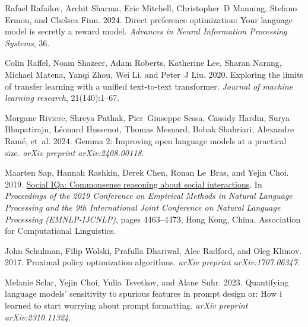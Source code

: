 \documentclass[11pt]{article}
\begin{document}
\begin{thebibliography}{88}
    Rafael Rafailov, Archit Sharma, Eric Mitchell, Christopher~D Manning, Stefano Ermon, and Chelsea Finn. 2024.
    \newblock Direct preference optimization: Your language model is secretly a reward model.
    \newblock \emph{Advances in Neural Information Processing Systems}, 36.
    
    Colin Raffel, Noam Shazeer, Adam Roberts, Katherine Lee, Sharan Narang, Michael Matena, Yanqi Zhou, Wei Li, and Peter~J Liu. 2020.
    \newblock Exploring the limits of transfer learning with a unified text-to-text transformer.
    \newblock \emph{Journal of machine learning research}, 21(140):1--67.
    
    Morgane Riviere, Shreya Pathak, Pier~Giuseppe Sessa, Cassidy Hardin, Surya Bhupatiraju, L{\'e}onard Hussenot, Thomas Mesnard, Bobak Shahriari, Alexandre Ram{\'e}, et~al. 2024.
    \newblock Gemma 2: Improving open language models at a practical size.
    \newblock \emph{arXiv preprint arXiv:2408.00118}.
    
    Maarten Sap, Hannah Rashkin, Derek Chen, Ronan Le~Bras, and Yejin Choi. 2019.
    \newblock \href {https://doi.org/10.18653/v1/D19-1454} {Social {IQ}a: Commonsense reasoning about social interactions}.
    \newblock In \emph{Proceedings of the 2019 Conference on Empirical Methods in Natural Language Processing and the 9th International Joint Conference on Natural Language Processing (EMNLP-IJCNLP)}, pages 4463--4473, Hong Kong, China. Association for Computational Linguistics.
    
    John Schulman, Filip Wolski, Prafulla Dhariwal, Alec Radford, and Oleg Klimov. 2017.
    \newblock Proximal policy optimization algorithms.
    \newblock \emph{arXiv preprint arXiv:1707.06347}.
    
    Melanie Sclar, Yejin Choi, Yulia Tsvetkov, and Alane Suhr. 2023.
    \newblock Quantifying language models' sensitivity to spurious features in prompt design or: How i learned to start worrying about prompt formatting.
    \newblock \emph{arXiv preprint arXiv:2310.11324}.
    

\end{thebibliography}
\end{document}

